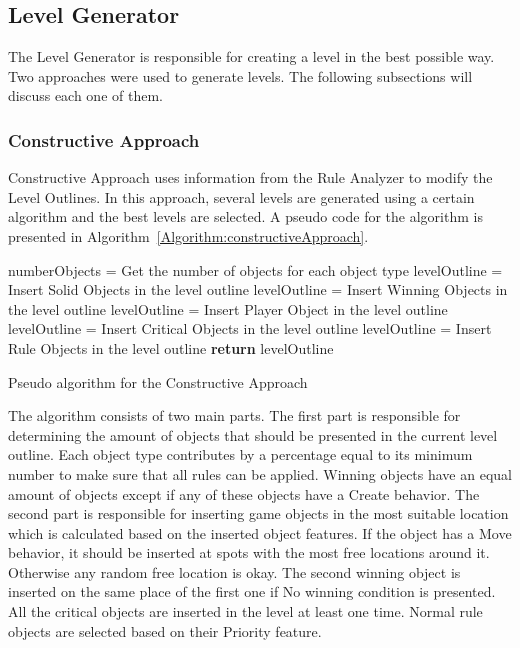 \documentclass[letterpaper]{article}
\newcommand{\algref}[1]{Algorithm~\ref{Algorithm:#1}}
\begin{document}
\subsection{Level Generator}
The Level Generator is responsible for creating a level in the best possible way. Two approaches were used to generate levels. The following subsections will discuss each one of them.

\subsubsection{Constructive Approach}
Constructive Approach uses information from the Rule Analyzer to modify the Level Outlines. In this approach, several levels are generated using a certain algorithm and the best levels are selected. A pseudo code for the algorithm is presented in \algref{constructiveApproach}.\\\par

\setlength{\textfloatsep}{0pt}
\begin{algorithm}[ht]
	\BlankLine
	numberObjects = Get the number of objects for each object type\;
	\BlankLine
	levelOutline = Insert Solid Objects in the level outline\;
	levelOutline = Insert Winning Objects in the level outline\;
	levelOutline = Insert Player Object in the level outline\;
	levelOutline = Insert Critical Objects in the level outline\;
	levelOutline = Insert Rule Objects in the level outline\;
	\BlankLine
	\textbf{return} levelOutline\;
	\caption{Pseudo algorithm for the Constructive Approach}
	\label{Algorithm:constructiveApproach}
\end{algorithm}
\setlength{\textfloatsep}{10pt}

The algorithm consists of two main parts. The first part is responsible for determining the amount of objects that should be presented in the current level outline. Each object type contributes by a percentage equal to its minimum number to make sure that all rules can be applied. Winning objects have an equal amount of objects except if any of these objects have a Create behavior. The second part is responsible for inserting game objects in the most suitable location which is calculated based on the inserted object features. If the object has a Move behavior, it should be inserted at spots with the most free locations around it. Otherwise any random free location is okay. The second winning object is inserted on the same place of the first one if No winning condition is presented. All the critical objects are inserted in the level at least one time. Normal rule objects are selected based on their Priority feature.
\end{document}
